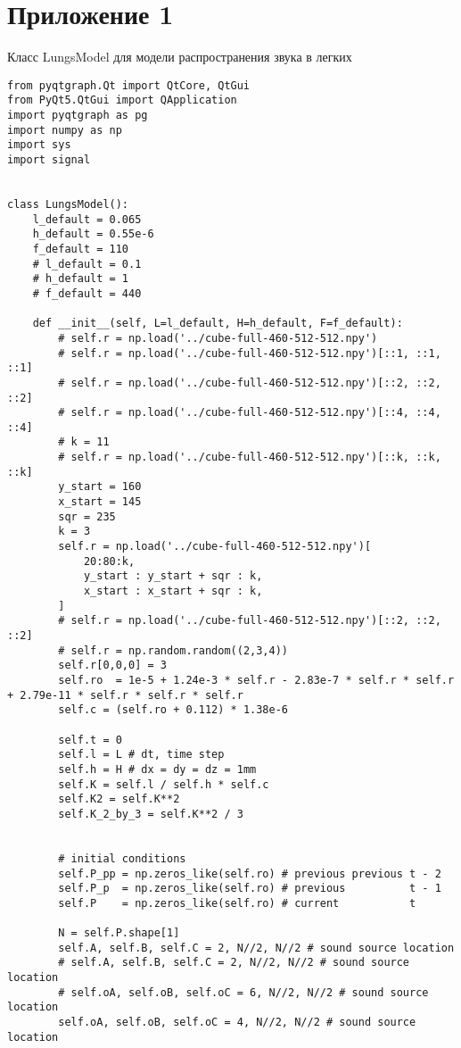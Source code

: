 \documentclass[../main.tex]{subfiles}
\begin{document}
\section{Приложение 1}
\label{appendix1}
Класс LungsModel для модели распространения звука в легких

\begin{lstlisting}
from pyqtgraph.Qt import QtCore, QtGui
from PyQt5.QtGui import QApplication
import pyqtgraph as pg
import numpy as np
import sys
import signal


class LungsModel():
    l_default = 0.065
    h_default = 0.55e-6
    f_default = 110
    # l_default = 0.1
    # h_default = 1
    # f_default = 440

    def __init__(self, L=l_default, H=h_default, F=f_default):
        # self.r = np.load('../cube-full-460-512-512.npy')
        # self.r = np.load('../cube-full-460-512-512.npy')[::1, ::1, ::1]
        # self.r = np.load('../cube-full-460-512-512.npy')[::2, ::2, ::2]
        # self.r = np.load('../cube-full-460-512-512.npy')[::4, ::4, ::4]
        # k = 11
        # self.r = np.load('../cube-full-460-512-512.npy')[::k, ::k, ::k]
        y_start = 160
        x_start = 145
        sqr = 235
        k = 3
        self.r = np.load('../cube-full-460-512-512.npy')[
            20:80:k,
            y_start : y_start + sqr : k,
            x_start : x_start + sqr : k,
        ]
        # self.r = np.load('../cube-full-460-512-512.npy')[::2, ::2, ::2]
        # self.r = np.random.random((2,3,4))
        self.r[0,0,0] = 3
        self.ro  = 1e-5 + 1.24e-3 * self.r - 2.83e-7 * self.r * self.r + 2.79e-11 * self.r * self.r * self.r
        self.c = (self.ro + 0.112) * 1.38e-6

        self.t = 0
        self.l = L # dt, time step
        self.h = H # dx = dy = dz = 1mm
        self.K = self.l / self.h * self.c
        self.K2 = self.K**2
        self.K_2_by_3 = self.K**2 / 3


        # initial conditions
        self.P_pp = np.zeros_like(self.ro) # previous previous t - 2
        self.P_p  = np.zeros_like(self.ro) # previous          t - 1
        self.P    = np.zeros_like(self.ro) # current           t

        N = self.P.shape[1]
        self.A, self.B, self.C = 2, N//2, N//2 # sound source location
        # self.A, self.B, self.C = 2, N//2, N//2 # sound source location
        # self.oA, self.oB, self.oC = 6, N//2, N//2 # sound source location
        self.oA, self.oB, self.oC = 4, N//2, N//2 # sound source location


\end{lstlisting}
\end{document}

